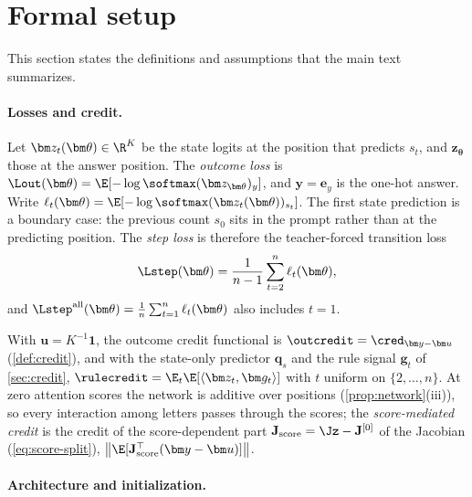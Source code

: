 \providecommand{\reg}[1]{\ensuremath{\mathsf{#1}}}

\section{Formal setup}
\label{app:formal}

This section states the definitions and assumptions that the main text summarizes.

\paragraph{Losses and credit.}

\begin{definition}
\label{def:losses}
Let $\bm z_t(\bm\theta)\in\R^K$ be the state logits at the position that predicts $s_t$, and $\bm z_{\bm\theta}$
those at the answer position. The \emph{outcome loss} is $\Lout(\bm\theta)=\E[-\log\softmax(\bm z_{\bm\theta})_y]$, and $\bm y=\bm e_y$ is the one-hot answer.
Write $\ell_t(\bm\theta)=\E[-\log\softmax(\bm z_t(\bm\theta))_{s_t}]$. The first state prediction is a boundary case: the previous
count $s_0$ sits in the prompt rather than at the predicting position. The \emph{step loss} is therefore the teacher-forced
transition loss
\[
 \Lstep(\bm\theta)=\frac{1}{n-1}\sum_{t=2}^n\ell_t(\bm\theta),
\]
and $\Lstep^{\mathrm{all}}(\bm\theta)=\tfrac{1}{n}\sum_{t=1}^n\ell_t(\bm\theta)$ also includes $t=1$.
\end{definition}

With $\bm u=K^{-1}\bm 1$, the outcome credit functional is $\outcredit=\cred_{\bm y-\bm u}$ (\cref{def:credit}), and with the state-only
predictor $\bm q_s$ and the rule signal $\bm g_t$ of \cref{sec:credit}, $\rulecredit=\E_t\E[\langle\bm z_t,\bm g_t\rangle]$ with $t$ uniform on $\{2,\ldots,n\}$. At zero
attention scores the network is additive over positions (\cref{prop:network}(iii)), so every interaction among letters passes through the
scores; the \emph{score-mediated credit} is the credit of the score-dependent part $\mathbf J_{\mathrm{score}}=\Jz-\mathbf J^{[0]}$ of the Jacobian (\cref{eq:score-split}),
$\bigl\|\E[\mathbf J_{\mathrm{score}}^\top(\bm y-\bm u)]\bigr\|$.

\paragraph{Architecture and initialization.}

